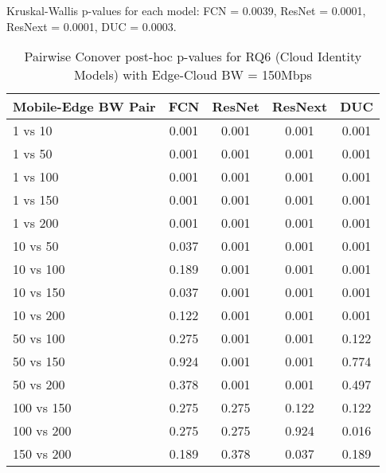 \begin{table}[h]
\centering
\caption{Pairwise Conover post-hoc p-values for RQ6 (Cloud Identity Models) with Edge-Cloud BW = 150Mbps}
\label{tab:conover_cloud_identity_ec150}
\smallskip
Kruskal-Wallis p-values for each model: FCN = 0.0039, ResNet = 0.0001, ResNext = 0.0001, DUC = 0.0003.

\begin{tabular}{lcccc}
\toprule
Mobile-Edge BW Pair & FCN & ResNet & ResNext & DUC \\
\midrule
1 vs 10 & 0.001 & 0.001 & 0.001 & 0.001 \\
1 vs 50 & 0.001 & 0.001 & 0.001 & 0.001 \\
1 vs 100 & 0.001 & 0.001 & 0.001 & 0.001 \\
1 vs 150 & 0.001 & 0.001 & 0.001 & 0.001 \\
1 vs 200 & 0.001 & 0.001 & 0.001 & 0.001 \\
10 vs 50 & 0.037 & 0.001 & 0.001 & 0.001 \\
10 vs 100 & 0.189 & 0.001 & 0.001 & 0.001 \\
10 vs 150 & 0.037 & 0.001 & 0.001 & 0.001 \\
10 vs 200 & 0.122 & 0.001 & 0.001 & 0.001 \\
50 vs 100 & 0.275 & 0.001 & 0.001 & 0.122 \\
50 vs 150 & 0.924 & 0.001 & 0.001 & 0.774 \\
50 vs 200 & 0.378 & 0.001 & 0.001 & 0.497 \\
100 vs 150 & 0.275 & 0.275 & 0.122 & 0.122 \\
100 vs 200 & 0.275 & 0.275 & 0.924 & 0.016 \\
150 vs 200 & 0.189 & 0.378 & 0.037 & 0.189 \\
\bottomrule
\end{tabular}
\end{table}

